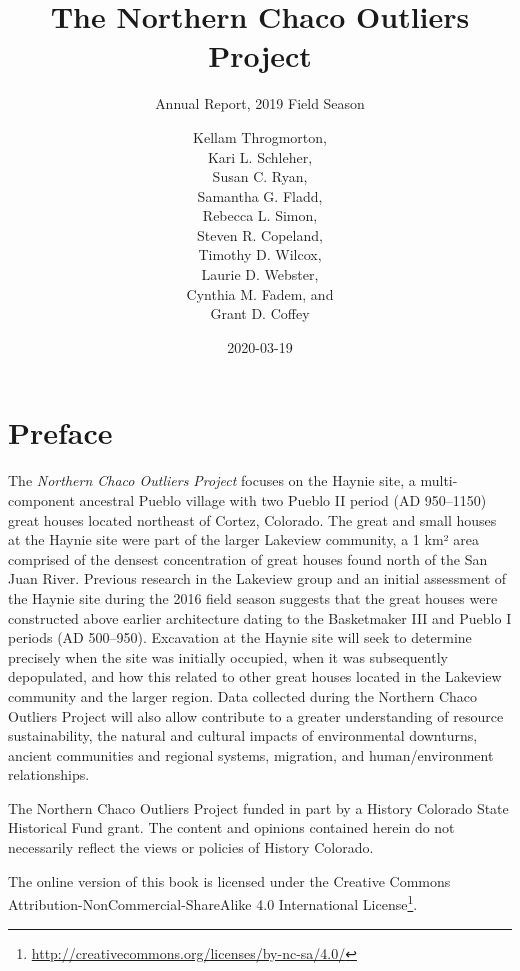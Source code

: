 \documentclass[
  12pt,
]{krantz}
\title{The Northern Chaco Outliers Project}
\subtitle{Annual Report, 2019 Field Season}
\author{Kellam Throgmorton,\\
Kari L. Schleher,\\
Susan C. Ryan,\\
Samantha G. Fladd,\\
Rebecca L. Simon,\\
Steven R. Copeland,\\
Timothy D. Wilcox,\\
Laurie D. Webster,\\
Cynthia M. Fadem, and\\
Grant D. Coffey}
\date{2020-03-19}
\renewcommand{\href}[2]{#2\footnote{\url{#1}}}
\begin{document}
\maketitle

\thispagestyle{empty}

\setlength{\abovedisplayskip}{-5pt}
\setlength{\abovedisplayshortskip}{-5pt}

{
\hypersetup{linkcolor=}
\setcounter{tocdepth}{2}
\tableofcontents
}
\listoftables
\listoffigures
\hypertarget{preface}{%
\chapter{Preface}\label{preface}}

The \emph{Northern Chaco Outliers Project} focuses on the Haynie site, a multi-component ancestral Pueblo village with two Pueblo II period (AD 950--1150) great houses located northeast of Cortez, Colorado. The great and small houses at the Haynie site were part of the larger Lakeview community, a 1 km² area comprised of the densest concentration of great houses found north of the San Juan River. Previous research in the Lakeview group and an initial assessment of the Haynie site during the 2016 field season suggests that the great houses were constructed above earlier architecture dating to the Basketmaker III and Pueblo I periods (AD 500--950). Excavation at the Haynie site will seek to determine precisely when the site was initially occupied, when it was subsequently depopulated, and how this related to other great houses located in the Lakeview community and the larger region. Data collected during the Northern Chaco Outliers Project will also allow contribute to a greater understanding of resource sustainability, the natural and cultural impacts of environmental downturns, ancient communities and regional systems, migration, and human/environment relationships.

The Northern Chaco Outliers Project funded in part by a History Colorado State Historical Fund grant. The content and opinions contained herein do not necessarily reflect the views or policies of History Colorado.

The online version of this book is licensed under the \href{http://creativecommons.org/licenses/by-nc-sa/4.0/}{Creative Commons Attribution-NonCommercial-ShareAlike 4.0 International License}.
\end{document}
